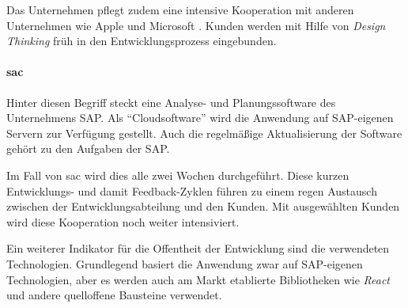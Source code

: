 Das Unternehmen pflegt zudem eine intensive Kooperation mit anderen Unternehmen
wie Apple \cite{Appleund81:online} und Microsoft \cite{Microsof58:online}.
Kunden werden mit Hilfe von \textit{Design Thinking} \cite{SAPDesig64:online} früh in den Entwicklungsprozess eingebunden.



\paragraph{\ac{sac}}\label{sec:beispiele-sap-sac}
Hinter diesen Begriff steckt eine Analyse- und Planungssoftware des Unternehmens SAP.
Als \enquote{Cloudsoftware} wird die Anwendung auf SAP-eigenen Servern zur Verfügung gestellt.
Auch die regelmäßige Aktualisierung der Software gehört zu den Aufgaben der SAP.

Im Fall von \ac{sac} wird dies alle zwei Wochen durchgeführt.
Diese kurzen Entwicklungs- und damit Feedback-Zyklen führen zu einem regen Austausch zwischen der Entwicklungsabteilung und den Kunden.
Mit ausgewählten Kunden wird diese Kooperation noch weiter intensiviert.

Ein weiterer Indikator für die Offentheit der Entwicklung sind die verwendeten Technologien.
Grundlegend basiert die Anwendung zwar auf SAP-eigenen Technologien,
aber es werden auch am Markt etablierte Bibliotheken wie \textit{React} und andere quelloffene Bausteine verwendet.
